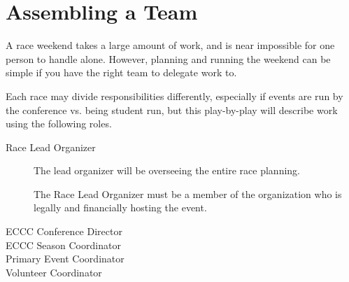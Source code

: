 \section{Assembling a Team}

A race weekend takes a large amount of work, and is near impossible for one person to handle alone.
However, planning and running the weekend can be simple if you have the right team to delegate work to.

Each race may divide responsibilities differently, especially if events are run by the conference
vs. being student run, but this play-by-play will describe work using the following roles.

\begin{description}
  \item[Race Lead Organizer]
    The lead organizer will be overseeing the entire race planning.

    The Race Lead Organizer must be a member of the organization who is legally and financially hosting the event.
  \item[ECCC Conference Director]
  \item[ECCC Season Coordinator]
  \item[Primary Event Coordinator]
  \item[Volunteer Coordinator]
\end{description}

